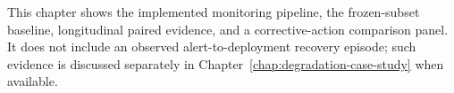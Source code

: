 This chapter shows the implemented monitoring pipeline, the frozen-subset baseline, longitudinal paired evidence, and a corrective-action comparison panel. It does not include an observed alert-to-deployment recovery episode; such evidence is discussed separately in Chapter~\ref{chap:degradation-case-study} when available.

